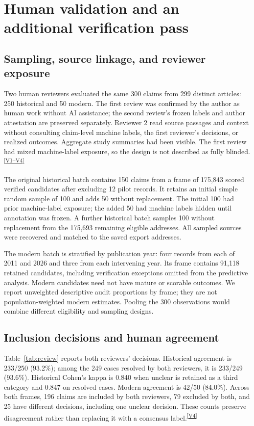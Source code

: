 \documentclass[iicol,pdflatex,sn-mathphys-num]{sn-jnl}
\newcommand{\evidence}[1]{\textsuperscript{\hyperref[app:evidence]{[#1]}}}
\begin{document}
\section{Human validation and an additional verification pass}
\subsection{Sampling, source linkage, and reviewer exposure}
Two human reviewers evaluated the same 300 claims from 299 distinct articles: 250 historical and 50 modern. The first review was confirmed by the author as human work without AI assistance; the second review's frozen labels and author attestation are preserved separately. Reviewer 2 read source passages and context without consulting claim-level machine labels, the first reviewer's decisions, or realized outcomes. Aggregate study summaries had been visible. The first review had mixed machine-label exposure, so the design is not described as fully blinded.\evidence{V1--V4}

The original historical batch contains 150 claims from a frame of 175,843 scored verified candidates after excluding 12 pilot records. It retains an initial simple random sample of 100 and adds 50 without replacement. The initial 100 had prior machine-label exposure; the added 50 had machine labels hidden until annotation was frozen. A further historical batch samples 100 without replacement from the 175,693 remaining eligible addresses. All sampled sources were recovered and matched to the saved export addresses.

The modern batch is stratified by publication year: four records from each of 2011 and 2026 and three from each intervening year. Its frame contains 91,118 retained candidates, including verification exceptions omitted from the predictive analysis. Modern candidates need not have mature or scorable outcomes. We report unweighted descriptive audit proportions by frame; they are not population-weighted modern estimates. Pooling the 300 observations would combine different eligibility and sampling designs.

\subsection{Inclusion decisions and human agreement}
Table~\ref{tab:review} reports both reviewers' decisions. Historical agreement is 233/250 (93.2\%); among the 249 cases resolved by both reviewers, it is 233/249 (93.6\%). Historical Cohen's kappa is 0.840 when unclear is retained as a third category and 0.847 on resolved cases. Modern agreement is 42/50 (84.0\%). Across both frames, 196 claims are included by both reviewers, 79 excluded by both, and 25 have different decisions, including one unclear decision. These counts preserve disagreement rather than replacing it with a consensus label.\evidence{V4}
\end{document}
